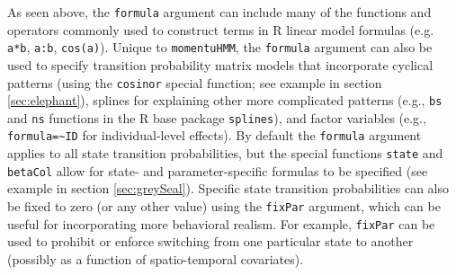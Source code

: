 \documentclass[12pt]{article}\usepackage[]{graphicx}\usepackage[]{color}
\begin{document}
As seen above, the \verb|formula| argument can include many of the functions and operators commonly used to construct terms in R linear model formulas (e.g. \verb|a*b|, \verb|a:b|, \verb|cos(a)|). Unique to \verb|momentuHMM|, the \verb|formula| argument can also be used to specify transition probability matrix models that incorporate cyclical patterns (using the \verb|cosinor| special function; see example in section \ref{sec:elephant}), splines for explaining other more complicated patterns (e.g., \verb|bs| and \verb|ns| functions in the R base package \verb|splines|), and factor variables (e.g., \verb|formula=~ID| for individual-level effects).  By default the \verb|formula| argument applies to all state transition probabilities, but the special functions \verb|state| and \verb|betaCol| allow for state- and parameter-specific formulas to be specified (see example in section \ref{sec:greySeal}). Specific state transition probabilities can also be fixed to zero (or any other value) using the \verb|fixPar| argument, which can be useful for incorporating more behavioral realism.  For example, \verb|fixPar| can be used to prohibit or enforce switching from one particular state to another (possibly as a function of spatio-temporal covariates). 
\end{document}
